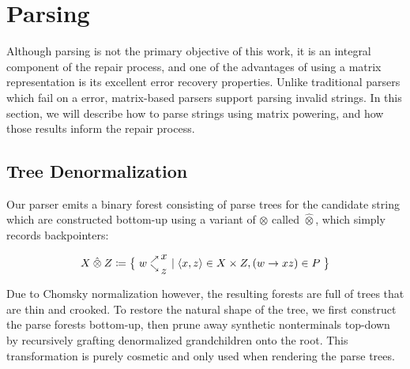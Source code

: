 \documentclass[sigplan,review,anonymous,acmsmall]{acmart}\settopmatter{printfolios=false,printccs=false,printacmref=false}
\begin{document}
\section{Parsing}\label{sec:parsing}

Although parsing is not the primary objective of this work, it is an integral component of the repair process, and one of the advantages of using a matrix representation is its excellent error recovery properties. Unlike traditional parsers which fail on a error, matrix-based parsers support parsing invalid strings. In this section, we will describe how to parse strings using matrix powering, and how those results inform the repair process.

\subsection{Tree Denormalization}\label{sec:denormalization}


Our parser emits a binary forest consisting of parse trees for the candidate string which are constructed bottom-up using a variant of $\otimes$ called $\hat{\otimes}$, which simply records backpointers:

\begin{align}
  X\:\hat{\otimes}\:Z \coloneqq \big\{\;w\hphantom{.}^{\nearrow}_{\searrow}\nobarfrac{x}{z} \mid \langle x, z\rangle \in X \times Z, (w\rightarrow xz) \in P\;\big\}
\end{align}

Due to Chomsky normalization however, the resulting forests are full of trees that are thin and crooked. To restore the natural shape of the tree, we first construct the parse forests bottom-up, then prune away synthetic nonterminals top-down by recursively grafting denormalized grandchildren onto the root. This transformation is purely cosmetic and only used when rendering the parse trees.
\end{document}
